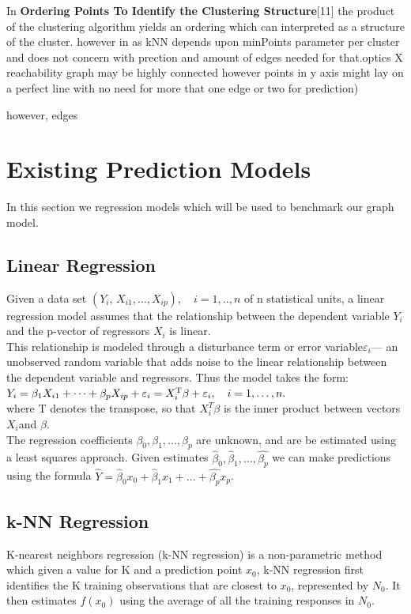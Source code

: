 \documentclass[a4paper]{article}
\begin{document}
In \textbf{Ordering Points To Identify the Clustering Structure}[11] the product of the clustering algorithm yields an ordering
which can interpreted as a structure of the cluster.
however in as kNN depends upon minPoints parameter
per cluster and does not concern with prection 
and amount of edges needed for that.optics X reachability graph may be highly connected  however points in y axis
might lay on a perfect line with no need for more that one edge
or two for prediction)
 
however, edges 

\pagebreak

\section{Existing Prediction Models}
In this section we regression models which will be used to benchmark our graph model.


\subsection{Linear Regression}
Given a data set $ (Y_i,\, X_{i1}, \ldots, X_{ip}),\quad i=1,..,n $ of n statistical units, 
a linear regression model assumes that the relationship between the dependent variable $Y_i$ and the p-vector of regressors $X_i$ is linear. 
\\This relationship is modeled through a disturbance term or error variable$ ε_i $— an unobserved random variable that adds noise to the linear relationship between the dependent variable and regressors. Thus the model takes the form:\\
$ Y_i = \beta_1 X_{i1} + \cdots + \beta_p X_{ip} + \varepsilon_i
 = X^{\rm T}_i\beta + \varepsilon_i, \quad i = 1, \ldots, n.$\\
where T denotes the transpose, so that $X_i^T\beta$ is the inner product between vectors
    $X_i $and $\beta$.\\
The regression coefficients $\beta_0, \beta_1,...,\beta_p $ are unknown, and are be estimated using a least squares approach. Given  estimates $\hat\beta_0, \hat\beta_1,...,\hat{\beta_p} $  we can make predictions using the formula 
$\hat{Y}= \hat\beta_0x_0+\hat\beta_1x_1+...+\hat{\beta_p}x_p $.


\subsection{k-NN Regression}
K-nearest neighbors regression (k-NN regression) 
is a non-parametric method which given a value for K and a prediction point $x_0$, k-NN
regression first identifies the K training observations that are closest to
$x_0$, represented by $N_0$. It then estimates $f(x_0)$ using the average of all the
training responses in $N_0$.\\
\end{document}
